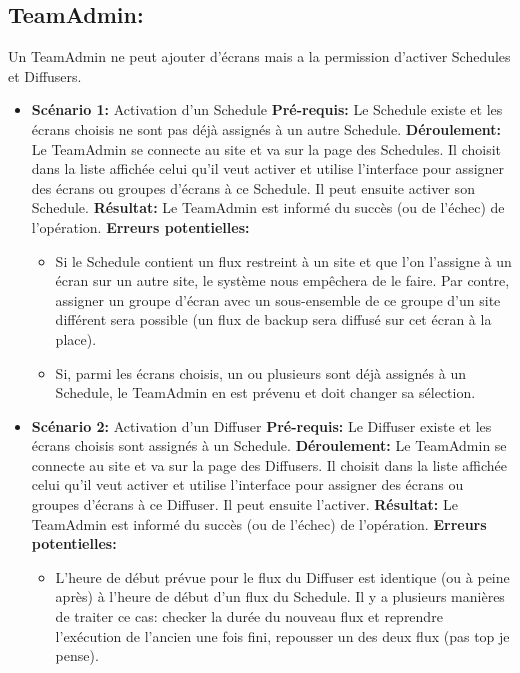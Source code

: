 \documentclass[french]{article}
\begin{document}
\begin{appendices}
	\subsection{TeamAdmin:} 
	Un TeamAdmin ne peut ajouter d'écrans mais a la permission d'activer Schedules et Diffusers. \newline
		\begin{itemize}	
			\item \textbf{Scénario 1:} Activation d'un Schedule\newline
			\textbf{Pré-requis:} Le Schedule existe et les écrans choisis ne sont pas déjà assignés à un autre Schedule.\newline
			\textbf{Déroulement:} Le TeamAdmin se connecte au site et va sur la page des Schedules. Il choisit dans la liste affichée celui qu'il veut activer et utilise l'interface pour assigner des écrans ou groupes d'écrans à ce Schedule. Il peut ensuite activer son Schedule. \newline
			\textbf{Résultat:} Le TeamAdmin est informé du succès (ou de l'échec) de l'opération.\newline
			\textbf{Erreurs potentielles:} 
			\begin{itemize}
				\item Si le Schedule contient un flux restreint à un site et que l'on l'assigne à un écran sur un autre site, le système nous empêchera de le faire. Par contre, assigner un groupe d'écran avec un sous-ensemble de ce groupe d'un site différent sera possible (un flux de backup sera diffusé sur cet écran à la place).
				\item Si, parmi les écrans choisis, un ou plusieurs sont déjà assignés à un Schedule, le TeamAdmin en est prévenu et doit changer sa sélection. \newline
			\end{itemize}			
		
		\item \textbf{Scénario 2:} Activation d'un Diffuser\newline
			\textbf{Pré-requis:} Le Diffuser existe et les écrans choisis sont assignés à un Schedule.\newline
			\textbf{Déroulement:} Le TeamAdmin se connecte au site et va sur la page des Diffusers. Il choisit dans la liste affichée celui qu'il veut activer et utilise l'interface pour assigner des écrans ou groupes d'écrans à ce Diffuser. Il peut ensuite l'activer. \newline
			\textbf{Résultat:} Le TeamAdmin est informé du succès (ou de l'échec) de l'opération.\newline
			\textbf{Erreurs potentielles:} 
			\begin{itemize}
				\item L'heure de début prévue pour le flux du Diffuser est identique (ou à peine après) à l'heure de début d'un flux du Schedule. Il y a plusieurs manières de traiter ce cas: checker la durée du nouveau flux et reprendre l'exécution de l'ancien une fois fini, repousser un des deux flux (pas top je pense).\newline
			\end{itemize}			
			   

\end{itemize}
\end{appendices}
\end{document}
